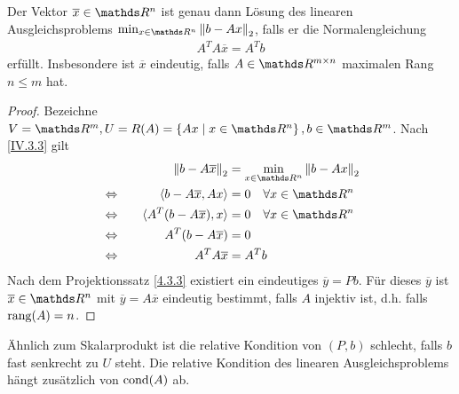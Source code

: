 \begin{Satze}
  Der Vektor $\overline{x} \in\R^n$ ist genau dann Lösung
  des linearen Ausgleichsproblems $\min_{x\in\Ren} \nn[b-Ax]_2$,
  falls er die Normalengleichung
  \begin{gather}
    A^TA\overline{x} = A^Tb
    \label{IV.3.6}
  \end{gather}
  erfüllt.
  Insbesondere ist $\overline{x}$ eindeutig,
  falls $A\in \R^{m\times n}$ maximalen Rang $n\leq m$ hat.
\end{Satze}

\begin{proof} Bezeichne
  $V= \R^m, U= R(A) = \left\{Ax \mid x \in\Ren \right\}, b \in\R^m$.
  Nach \eqref{IV.3.3} gilt
  \begin{alignat*}{2}
    &&\nn[b-A\overline{x}]_2 &= \min_{x\in\Ren} \nn[b-Ax]_2 \\
    &\Leftrightarrow \quad & \scp{b-A \overline{x}}{Ax} &= 0 \quad \forall x\in \Ren \\
    &\Leftrightarrow & \scp{A^T(b-A\overline{x})}{x} &= 0 \quad  \forall x\in\Ren \\
    &\Leftrightarrow & A^T(b-A\overline{x}) &= 0 \\
    &\Leftrightarrow & A^TA\overline{x} &= A^Tb
  \end{alignat*}
  Nach dem Projektionssatz \ref{4.3.3} existiert ein eindeutiges
  $\overline{y} = P b$.
  Für dieses $\overline{y}$ ist $\overline{x}\in \Ren $
  mit $\overline{y} = A\overline{x}$ eindeutig bestimmt, 
  falls $A$ injektiv ist, d.h. falls $\operatorname{rang}(A) = n$. 
\end{proof}

Ähnlich zum Skalarprodukt ist die relative Kondition von $(P,b) $ schlecht, 
falls $b$ fast senkrecht zu $U$ steht.
Die relative Kondition des linearen Ausgleichsproblems
hängt zusätzlich von $\operatorname{cond}(A)$ ab.


